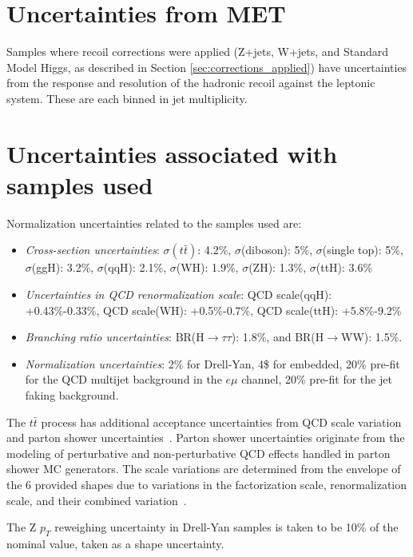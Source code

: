\section{Uncertainties from MET}
\label{section:MET_uncertainties}
Samples where recoil corrections were applied (Z+jets, W+jets, and Standard Model Higgs, as described in Section \ref{sec:corrections_applied}) have uncertainties from the response and resolution of the hadronic recoil against the leptonic system. These are each binned in jet multiplicity.

\section{Uncertainties associated with samples used}
\label{section:uncertainties_samples}
Normalization uncertainties related to the samples used are:
\begin{itemize}
    \item \textit{Cross-section uncertainties}: $\sigma(t\bar{t})$: 4.2\%, $\sigma$(diboson): 5\%,  $\sigma$(single top): 5\%, $\sigma$(ggH): 3.2\%, $\sigma$(qqH): 2.1\%, $\sigma$(WH): 1.9\%, $\sigma$(ZH): 1.3\%, $\sigma$(ttH): 3.6\%
    \item \textit{Uncertainties in QCD renormalization scale}: QCD scale(qqH): +0.43\%-0.33\%, QCD scale(WH): +0.5\%-0.7\%, QCD scale(ttH): +5.8\%-9.2\%
    \item \textit{Branching ratio uncertainties}: BR(H$\rightarrow\tau\tau$): 1.8\%, and BR(H$\rightarrow$WW): 1.5\%.
    \item \textit{Normalization uncertainties}: 2\% for Drell-Yan, 4\$ for embedded, 20\% pre-fit for the QCD multijet background in the $e\mu$ channel, 20\% pre-fit for the jet faking background.
\end{itemize}

The $t\bar{t}$ process has additional acceptance uncertainties from QCD scale variation and parton shower uncertainties~\cite{twiki_Top_systematics}.  Parton shower uncertainties originate from the modeling of perturbative and non-perturbative QCD effects handled in parton shower MC generators. The scale variations are determined from the envelope of the 6 provided shapes due to variations in the factorization scale, renormalization scale, and their combined variation~\cite{twiki_Top_systematics}.

The Z $p_{T}$ reweighing uncertainty in Drell-Yan samples is taken to be 10\% of the nominal value, taken as a shape uncertainty. 

